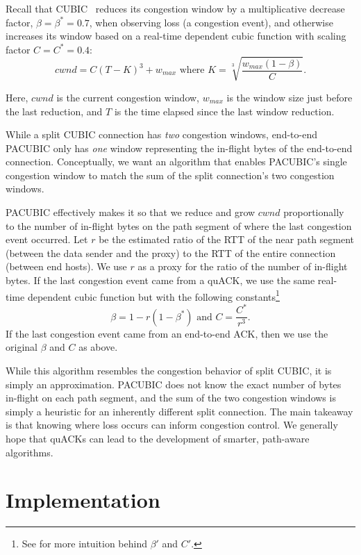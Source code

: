 Recall that CUBIC~\cite{ha2008cubic} reduces its congestion window by a
multiplicative decrease factor,
$\beta = \beta^* = 0.7$, when observing loss (a congestion event), and otherwise increases
its window based on a real-time dependent cubic function with scaling factor
$C=C^*=0.4$:
\[
cwnd = C(T-K)^3 + w_{max} \text{ where } K = \sqrt[3]{\frac{w_{max}(1-\beta)}{C}}.
\]

\noindent Here, $cwnd$ is the current congestion window,
$w_{max}$ is the window size just before the last reduction,
and $T$ is the time elapsed since the last window reduction.

While a split CUBIC connection has \emph{two} congestion windows,
end-to-end PACUBIC only has \emph{one} window representing the in-flight bytes
of the end-to-end connection.
Conceptually, we want an algorithm that enables PACUBIC's single
congestion window to match the sum of the split connection's two congestion
windows.

PACUBIC effectively makes it so that we reduce and grow $cwnd$
proportionally to the number of in-flight bytes on the path segment
of where the last congestion event occurred.
Let $r$ be the estimated ratio of the RTT of the near path segment
(between the data sender and the proxy) to the RTT of the entire connection
(between end hosts).
We use $r$ as a proxy for the ratio of the number of in-flight bytes.
If the last congestion event came from a quACK, we use the same real-time
dependent cubic function but with the following
constants\footnote{See  for more intuition behind $\beta'$ and $C'$.}
\[
\beta = 1 - r(1-\beta^*)\text{ and }C = \frac{C^*}{r^3}.
\]
\noindent If the last congestion event came from an end-to-end ACK, then we use
the original $\beta$ and $C$ as above.

While this algorithm resembles the congestion behavior of split CUBIC, it is
simply an approximation. PACUBIC does not know the exact number of bytes
in-flight on each path segment, and the sum of the two congestion windows is simply a
heuristic for an inherently different split connection. The main takeaway is
that knowing where loss occurs can inform congestion control. We generally
hope that quACKs can lead to the development of smarter, path-aware algorithms.

\section{Implementation}
\label{sec:sidekick:implementation}

